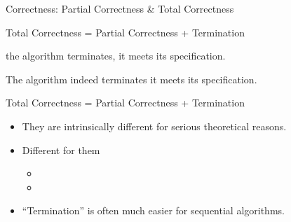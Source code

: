 \begin{frame}{}
  \begin{center}
    Correctness: Partial Correctness \& Total Correctness
  \end{center}
  
  \pause
  \begin{definition}
    Total Correctness = Partial Correctness + Termination 
  \end{definition}
  
  \pause
  \vspace{0.50cm}
  \begin{definition}
     the algorithm terminates, it meets its specification.
  \end{definition}
  
  \pause
  \vspace{0.50cm}
  \begin{definition}
    The algorithm indeed terminates  it meets its specification.
  \end{definition}
\end{frame}

\begin{frame}{}
  \begin{center}
  \end{center}
  
  \begin{definition}
    Total Correctness = Partial Correctness + Termination 
  \end{definition}
  
  \vspace{0.50cm}
  \begin{itemize}
    \setlength{\itemsep}{8pt}
    \pause
    \item They are intrinsically different for serious theoretical reasons.
    \pause
    \item Different  for them 
      \begin{itemize}
        \setlength{\itemsep}{5pt}
        \item {}
        \item {}
      \end{itemize}
    \pause
    \item ``Termination'' is often much easier for sequential algorithms.
  \end{itemize}
\end{frame}
